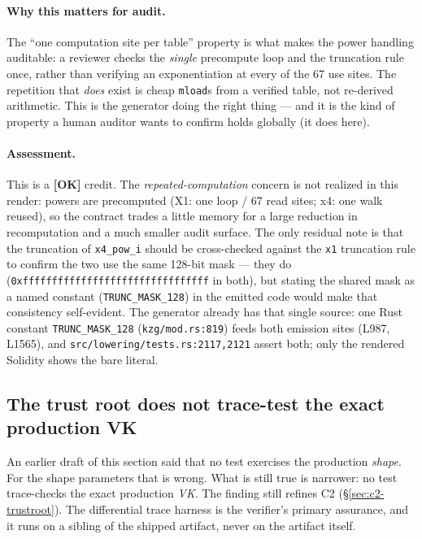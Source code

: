 \paragraph{Why this matters for audit.}
The ``one computation site per table'' property is what makes the
power handling auditable: a reviewer checks the \emph{single}
precompute loop and the truncation rule once, rather than
verifying an exponentiation at every of the 67 use sites. The
repetition that \emph{does} exist is cheap \texttt{mload}s from a
verified table, not re-derived arithmetic. This is the generator
doing the right thing --- and it is the kind of property a
human auditor wants to confirm holds globally (it does here).

\paragraph{Assessment.} This is a
\textcolor{tracegreen}{\textbf{[OK]}} credit. The
\emph{repeated-computation} concern is not realized in this
render: powers are precomputed (X1: one loop / 67 read sites; x4: one
walk reused), so the contract trades a little memory for a large
reduction in recomputation and a much smaller audit surface. The
only residual note is that the truncation of \texttt{x4\_pow\_i}
should be cross-checked against the \texttt{x1} truncation rule
to confirm the two use the same 128-bit mask --- they do
(\texttt{0xffffffffffffffffffffffffffffffff} in both), but
stating the shared mask as a named constant
(\texttt{TRUNC\_MASK\_128}) in the emitted code would make that
consistency self-evident.  The generator already
has that single source: one Rust constant \texttt{TRUNC\_MASK\_128}
(\texttt{kzg/mod.rs:819}) feeds both emission sites (L987, L1565),
and \texttt{src/\allowbreak{}lowering/\allowbreak{}tests.rs:2117,2121} assert both; only the
rendered Solidity shows the bare literal.

\subsection{The trust root does not trace-test the exact production VK}
\label{sec:pr-fuzz-coverage}

 An earlier draft of this section said that no
test exercises the production \emph{shape}. For the shape parameters
that is wrong. What is still true is narrower: no test trace-checks
the exact production \emph{VK}. The finding still refines C2
(\S\ref{sec:c2-trustroot}). The differential trace harness is the
verifier's primary assurance, and it runs on a sibling of the shipped
artifact, never on the artifact itself.

